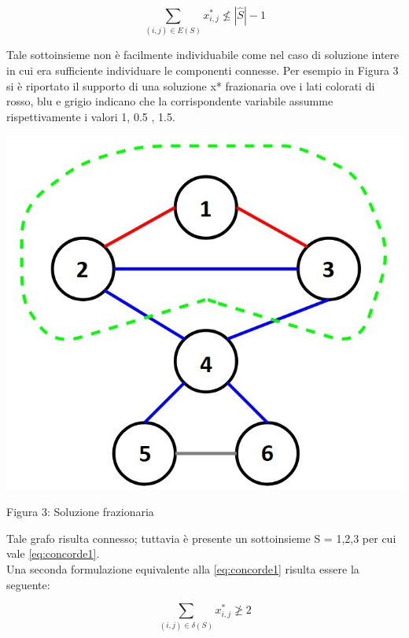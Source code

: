 \documentclass[11pt]{article}
\begin{document}
\begin{equation}\label{eq:concorde1}
\displaystyle{\sum_{\left ( i,j \right )\in E\left ( S \right )} x_{i,j}^{*}\nleqslant \left | \widehat{S} \right |-1}
\end{equation}

Tale sottoinsieme non è facilmente individuabile come nel caso di soluzione intere in cui era sufficiente individuare le componenti connesse. Per esempio in Figura 3 si è riportato il supporto di una soluzione x* frazionaria ove i lati colorati di rosso, blu e grigio indicano che la corrispondente variabile assumme rispettivamente i valori 1, 0.5 , 1.5.

\begin{center}
    \includegraphics[scale=0.5]{SoluzioneFrazionaria}  
    
    Figura 3: Soluzione frazionaria
\end{center}

Tale grafo risulta connesso; tuttavia è presente un sottoinsieme S = {1,2,3} per cui vale \eqref{eq:concorde1}.\\
Una seconda formulazione equivalente alla \eqref{eq:concorde1} risulta essere la seguente:

\begin{equation}\label{eq:concorde2}
\displaystyle{\sum_{\left ( i,j \right )\in \delta \left ( S \right )} x_{i,j}^{*}\ngeqslant 2}
\end{equation}
\end{document}
